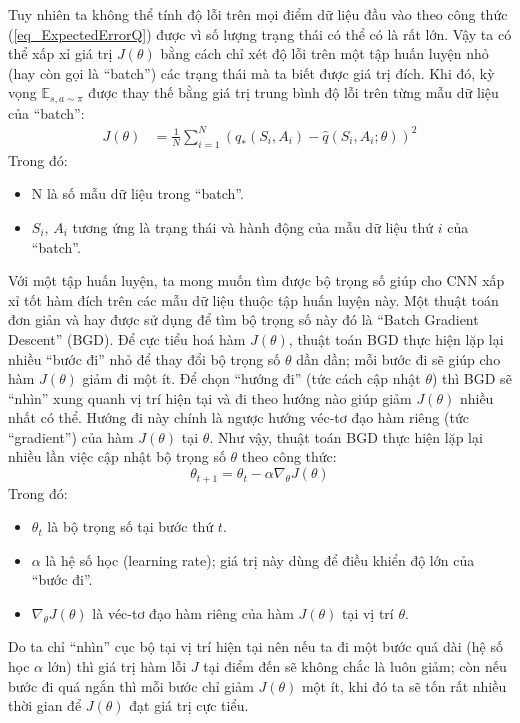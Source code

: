 	Tuy nhiên ta không thể tính độ lỗi trên mọi điểm dữ liệu đầu vào theo công thức (\ref{eq_ExpectedErrorQ}) được vì số lượng trạng thái có thể có là rất lớn.
	Vậy ta có thể xấp xỉ giá trị $J(\theta)$ bằng cách chỉ xét độ lỗi trên một tập huấn luyện nhỏ (hay còn gọi là ``batch'') các trạng thái mà ta biết được giá trị đích.
	Khi đó, kỳ vọng $\mathbb{E}_{s,a \sim \pi}$ được thay thế bằng giá trị trung bình độ lỗi trên từng mẫu dữ liệu của ``batch'':
	\begin{align}
		\label{eq_BatchErrorQ}
		J(\theta) &= \frac{1}{N} \sum_{i = 1}^{N}(q_{*}(S_i,A_i) - \hat{q}(S_i,A_i;\theta))^2		
	\end{align}
	Trong đó:
	\begin{itemize}
		\item N là số mẫu dữ liệu trong ``batch''.
		\item $S_i$, $A_i$ tương ứng là trạng thái và hành động của mẫu dữ liệu thứ $i$ của ``batch''.
	\end{itemize}
	Với một tập huấn luyện, ta mong muốn tìm được bộ trọng số giúp cho CNN xấp xỉ tốt hàm đích trên các mẫu dữ liệu thuộc tập huấn luyện này.
	Một thuật toán đơn giản và hay được sử dụng để tìm bộ trọng số này đó là ``Batch Gradient Descent'' (BGD).
	Để cực tiểu hoá hàm $J(\theta)$, thuật toán BGD thực hiện lặp lại nhiều ``bước đi'' nhỏ để thay đổi bộ trọng số $\theta$ dần dần; mỗi bước đi sẽ giúp cho hàm $J(\theta)$ giảm đi một ít.
	Để chọn ``hướng đi'' (tức cách cập nhật $\theta$) thì BGD sẽ ``nhìn'' xung quanh vị trí hiện tại và đi theo hướng nào giúp giảm $J(\theta)$ nhiều nhất có thể.
	Hướng đi này chính là ngược hướng véc-tơ đạo hàm riêng (tức ``gradient'') của hàm $J(\theta)$ tại $\theta$.
	Như vậy, thuật toán BGD thực hiện lặp lại nhiều lần việc cập nhật bộ trọng số $\theta$ theo công thức:
	\begin{equation}
		\theta_{t+1} = \theta_{t} - \alpha \nabla_{\theta}J(\theta)
	\end{equation}
	Trong đó:
	\begin{itemize}
		\item $\theta_{t}$ là bộ trọng số tại bước thứ $t$.
		\item $\alpha$ là hệ số học (learning rate); giá trị này dùng để điều khiển độ lớn của ``bước đi''.
		\item $\nabla_{\theta}J(\theta)$ là véc-tơ đạo hàm riêng của hàm $J(\theta)$ tại vị trí $\theta$.
	\end{itemize}
	Do ta chỉ ``nhìn'' cục bộ tại vị trí hiện tại nên nếu ta đi một bước quá dài (hệ số học $\alpha$ lớn) thì giá trị hàm lỗi $J$ tại điểm đến sẽ không chắc là luôn giảm;
	còn nếu bước đi quá ngắn thì mỗi bước chỉ giảm $J(\theta)$ một ít, khi đó ta sẽ tốn rất nhiều thời gian để $J(\theta)$ đạt giá trị cực tiểu.
	
